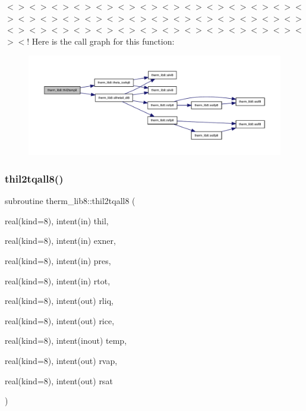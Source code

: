 $<$$>$$<$$>$$<$$>$$<$$>$$<$$>$$<$$>$$<$$>$$<$$>$$<$$>$$<$$>$$<$$>$$<$$>$$<$$>$$<$$>$$<$$>$$<$$>$$<$$>$$<$$>$$<$$>$$<$$>$$<$$>$$<$$>$$<$$>$$<$$>$$<$$>$$<$$>$$<$$>$$<$$>$$<$$>$$<$$>$$<$$>$$<$$>$$<$$>$$<$$>$$<$$>$$<$$>$$<$$>$$<$$>$$<$$>$$<$$>$$<$$>$$<$! Here is the call graph for this function\+:
\nopagebreak
\begin{figure}[H]
\begin{center}
\leavevmode
\includegraphics[width=350pt]{namespacetherm__lib8_a7d009d0d3507e656b58c9eb70c747598_cgraph}
\end{center}
\end{figure}
\mbox{\label{namespacetherm__lib8_ac25af6f3203cd6cbf1e3933ae25eaeca}} 
\subsubsection{\texorpdfstring{thil2tqall8()}{thil2tqall8()}}
{\footnotesize\ttfamily subroutine therm\+\_\+lib8\+::thil2tqall8 (\begin{DoxyParamCaption}\item[{real(kind=8), intent(in)}]{thil,  }\item[{real(kind=8), intent(in)}]{exner,  }\item[{real(kind=8), intent(in)}]{pres,  }\item[{real(kind=8), intent(in)}]{rtot,  }\item[{real(kind=8), intent(out)}]{rliq,  }\item[{real(kind=8), intent(out)}]{rice,  }\item[{real(kind=8), intent(inout)}]{temp,  }\item[{real(kind=8), intent(out)}]{rvap,  }\item[{real(kind=8), intent(out)}]{rsat }\end{DoxyParamCaption})}


